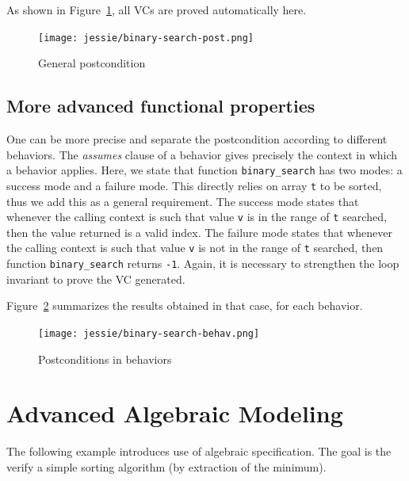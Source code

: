 \documentclass[a4paper,11pt,twoside,openright]{report}
\newcommand{\negtenthspace}{\hspace*{-0.1\linewidth}}
\begin{document}


As shown in Figure~\ref{fig:post}, all VCs are proved automatically here.

\begin{figure}[t]
  \begin{center}
    \negtenthspace\texttt{[image: jessie/binary-search-post.png]}
  \end{center}
  \caption{General postcondition}
  \label{fig:post}
  \hrulefill
\end{figure}

\subsection{More advanced functional properties}

One can be more precise and separate the postcondition according to
different behaviors. The \emph{assumes} clause of a behavior gives
precisely the context in which a behavior applies. Here, we state that
function \verb|binary_search| has two modes: a success mode and a
failure mode. This directly relies on array \verb|t| to be sorted,
thus we add this as a general requirement. The success mode states
that whenever the calling context is such that value \verb|v| is in
the range of \verb|t| searched, then the value returned is a valid
index. The failure mode states that whenever the calling context is
such that value \verb|v| is not in the range of \verb|t| searched,
then function \verb|binary_search| returns \verb|-1|.  Again, it is
necessary to strengthen the loop invariant to prove the VC generated.



Figure~\ref{fig:behav} summarizes the results obtained in that case,
for each behavior.

\begin{figure}[t]
  \begin{center}
    \negtenthspace\texttt{[image: jessie/binary-search-behav.png]}
  \end{center}
  \caption{Postconditions in behaviors}
  \label{fig:behav}
  \hrulefill
\end{figure}

\section{Advanced Algebraic Modeling}

The following example introduces use of algebraic specification. The
goal is the verify a simple sorting algorithm (by extraction of the
minimum).
\end{document}
